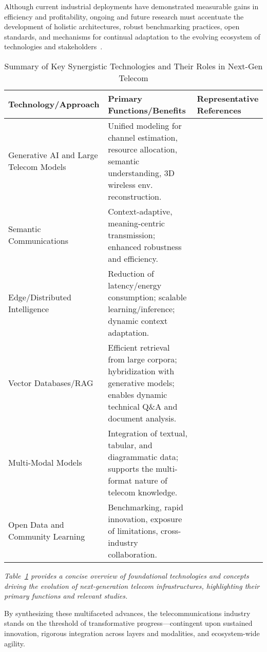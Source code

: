 \documentclass[11pt]{article}
\begin{document}
Although current industrial deployments have demonstrated measurable gains in efficiency and profitability, ongoing and future research must accentuate the development of holistic architectures, robust benchmarking practices, open standards, and mechanisms for continual adaptation to the evolving ecosystem of technologies and stakeholders~\cite{ref11,ref21,ref22,ref23,ref24,ref25,ref49}.

\begin{table}[t]
\centering
\caption{Summary of Key Synergistic Technologies and Their Roles in Next-Gen Telecom}
\label{tab:synergy_summary}
\begin{tabular}{|p{4cm}|p{7cm}|p{3cm}|}
\hline
\textbf{Technology/Approach} & \textbf{Primary Functions/Benefits} & \textbf{Representative References} \\
\hline
Generative AI and Large Telecom Models  & Unified modeling for channel estimation, resource allocation, semantic understanding, 3D wireless env. reconstruction. & \cite{ref24,ref20,ref26} \\
\hline
Semantic Communications   & Context-adaptive, meaning-centric transmission; enhanced robustness and efficiency. & \cite{ref20,ref26} \\
\hline
Edge/Distributed Intelligence & Reduction of latency/energy consumption; scalable learning/inference; dynamic context adaptation. & \cite{ref12,ref14,ref19,ref21,ref25} \\
\hline
Vector Databases/RAG  & Efficient retrieval from large corpora; hybridization with generative models; enables dynamic technical Q\&A and document analysis. & \cite{ref11,ref22,ref23,ref29} \\
\hline
Multi-Modal Models  & Integration of textual, tabular, and diagrammatic data; supports the multi-format nature of telecom knowledge. & \cite{ref21,ref29} \\
\hline
Open Data and Community Learning & Benchmarking, rapid innovation, exposure of limitations, cross-industry collaboration. & \cite{ref11,ref21,ref22,ref23} \\
\hline
\end{tabular}
\end{table}

\textit{Table~\ref{tab:synergy_summary} provides a concise overview of foundational technologies and concepts driving the evolution of next-generation telecom infrastructures, highlighting their primary functions and relevant studies.}

\vspace{2em}
\noindent
By synthesizing these multifaceted advances, the telecommunications industry stands on the threshold of transformative progress—contingent upon sustained innovation, rigorous integration across layers and modalities, and ecosystem-wide agility.
\end{document}
